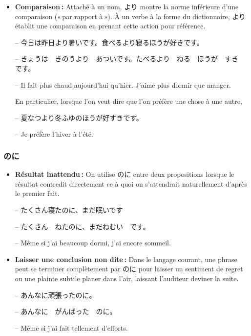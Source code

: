     \begin{itemize}
        \item \textbf{Comparaison :} Attaché à un nom, より montre la norme inférieure d'une comparaison (« par rapport à »). À un verbe à la forme du dictionnaire, より établit une comparaison en prenant cette action pour référence.
        
        \begin{tcolorbox}
            -- 今日は昨日より暑いです。食べるより寝るほうが好きです。

            -- きょうは　きのうより　あついです。たべるより　ねる　ほうが　すき　です。

            -- Il fait plus chaud aujourd'hui qu'hier. J'aime plus dormir que manger.
        \end{tcolorbox}

        En particulier, lorsque l’on veut dire que l’on préfère une chose à une autre, 

        \begin{tcolorbox}
            -- {夏}{なつ}より{冬}{ふゆ}のほうが{好}{す}きです。

            -- Je préfère l’hiver à l’été.
        \end{tcolorbox}
    \end{itemize}

        \subsubsection{のに}

    \begin{itemize}
        \item \textbf{Résultat inattendu :} On utilise のに entre deux propositions lorsque le résultat contredit directement ce à quoi on s'attendrait naturellement d'après le premier fait.
        
        \begin{tcolorbox}
            -- たくさん寝たのに、まだ眠いです

            -- たくさん　ねたのに、まだねむい　です。

            -- Même si j'ai beaucoup dormi, j'ai encore sommeil.
        \end{tcolorbox}

        \item \textbf{Laisser une conclusion non dite :} Dans le langage courant, une phrase peut se terminer complètement par のに pour laisser un sentiment de regret ou une plainte subtile planer dans l'air, laissant l'auditeur deviner la suite.
        
        \begin{tcolorbox}
            -- あんなに頑張ったのに。

            -- あんなに　がんばった　のに。

            -- Même si j'ai fait tellement d'efforts.
        \end{tcolorbox}
    \end{itemize}

